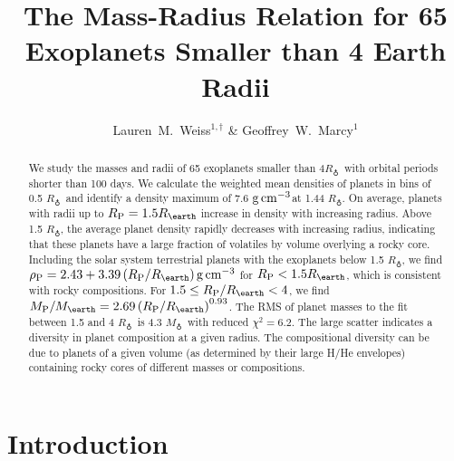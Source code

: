 \documentclass[iop]{emulateapj}
\newcommand{\gcmc}{\ensuremath{\rm g\,cm^{-3}}}
\newcommand{\gcc}{\gcmc}
\newcommand{\rpl}{\ensuremath{R_{\rm P}}}
\newcommand{\mpl}{\ensuremath{M_{\rm P}}}
\newcommand{\rhopl}{\ensuremath{\rho_{\rm P}}}
\newcommand{\rearth}{\ensuremath{R_\earth}}
\newcommand{\mearth}{\ensuremath{M_\earth}}
\begin{document}
\title{The Mass-Radius Relation for 65 Exoplanets Smaller than 4 Earth Radii}
\author{Lauren~M.~Weiss$^{1,\dagger}$ \& Geoffrey~W.~Marcy$^1$}


\begin{abstract}
We study the masses and radii of 65 exoplanets smaller than 4\rearth\ with orbital periods shorter than 100 days.  We calculate the weighted mean densities of planets in bins of 0.5 \rearth\ and identify a density maximum of 7.6 \gcc at 1.44 \rearth.  On average, planets with radii up to $\rpl=1.5\rearth$ increase in density with increasing radius.   Above 1.5 \rearth, the average planet density rapidly decreases with increasing radius, indicating that these planets have a large fraction of volatiles by volume overlying a rocky core.  Including the solar system terrestrial planets with the exoplanets below 1.5 \rearth, we find $\rhopl = 2.43 + 3.39 \left(\rpl/\rearth\right) \gcc$ for $\rpl < 1.5 \rearth$, which is consistent with rocky compositions.  For $1.5 \le \rpl/\rearth < 4$, we find $\mpl/\mearth = 2.69 \left(\rpl/\rearth\right)^{0.93}$.  The RMS of planet masses to the fit between 1.5 and 4 \rearth\ is 4.3 \mearth\ with reduced $\chi^2=6.2$.  The large scatter indicates a diversity in planet composition at a given radius.  The compositional diversity can be due to planets of a given volume (as determined by their large H/He envelopes) containing rocky cores of different masses or compositions.
\end{abstract}


\section{Introduction}
\end{document}
